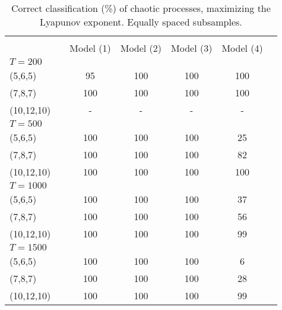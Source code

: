 \documentclass[12pt]{article}
\begin{document}
\begin{table} [H]\scriptsize
    \caption{ Correct classification (\%) of chaotic processes, maximizing the Lyapunov exponent. Equally spaced subsamples.}
    \begin{tabular*}{\textwidth}{@{\extracolsep{\fill}}lcccccc}
        \hline &  &  &  & &   \\ 
          &  &  Model (1) & Model (2)  & Model (3) & Model (4)  \\ 
        $T=200$  &  &  &  & &  & \\
        (5,6,5)                           &  & 95   & 100  & 100 &  100  \\ 
        (7,8,7)                           &  & 100  & 100  & 100 &  100  \\ 
        (10,12,10)                        &  & -    &  -   &  -  &  - \\ 
        \hline 
         $T=500$  &  &   & & &    \\ 

        (5,6,5)                           &  & 100 & 100 & 100 & 25  \\ 
        (7,8,7)                           &  & 100 & 100 & 100 & 82 \\ 
        (10,12,10)                        &  & 100 & 100 & 100 & 100 \\ 
\hline 
         $T=1000$  &  &   &   &  &    \\ 

        (5,6,5)                           &  & 100 & 100 & 100   & 37  \\ 
        (7,8,7)                           &  & 100 & 100 & 100   & 56 \\ 
        (10,12,10)                        &  & 100 & 100 & 100   & 99 \\ 
\hline      
         $T=1500$  &  &   &   &  &   \\ 

        (5,6,5)                           &  & 100 & 100 &  100  &  6  \\ 
        (7,8,7)                           &  & 100 & 100 &  100  &  28 \\ 
        (10,12,10)                        &  & 100 & 100 &  100  &  99 \\ 
\hline      
    \end{tabular*}
\end{table}
\end{document}
